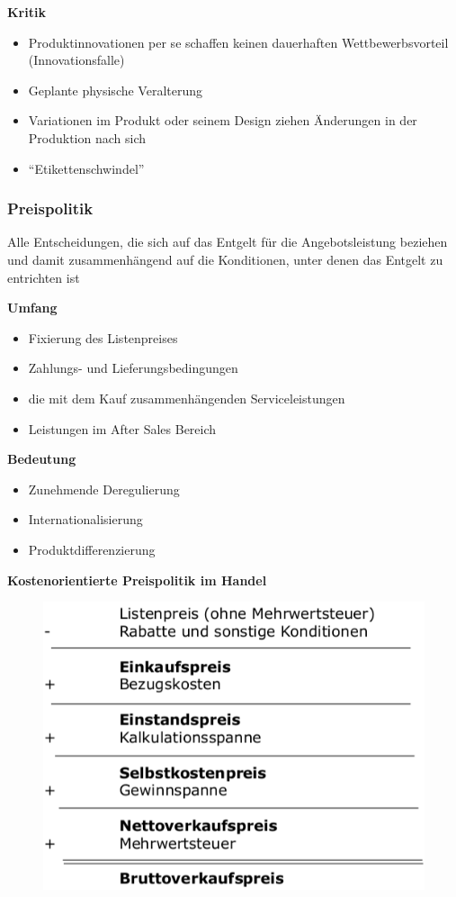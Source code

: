 \documentclass[a4paper,11pt, twoside]{article}
\begin{document}
\textbf{Kritik}
\begin{itemize}
	\item Produktinnovationen per se schaffen keinen dauerhaften Wettbewerbsvorteil (Innovationsfalle)
	\item Geplante physische Veralterung
	\item Variationen im Produkt oder seinem Design ziehen Änderungen in der Produktion nach sich
	\item "`Etikettenschwindel"'
\end{itemize}

\subsubsection{Preispolitik}
Alle Entscheidungen, die sich auf das Entgelt für die Angebotsleistung beziehen und damit zusammenhängend auf die Konditionen, unter denen das Entgelt zu entrichten ist

\textbf{Umfang}
\begin{itemize}
	\item Fixierung des Listenpreises
	\item Zahlungs- und Lieferungsbedingungen
	\item die mit dem Kauf zusammenhängenden Serviceleistungen
	\item Leistungen im After Sales Bereich
\end{itemize}

\textbf{Bedeutung}
\begin{itemize}
	\item Zunehmende Deregulierung
	\item Internationalisierung
	\item Produktdifferenzierung
\end{itemize}

\textbf{Kostenorientierte Preispolitik im Handel}
\begin{figure}[h]
 \begin{center}
   \includegraphics[scale=0.3]{bilder/kostenorientierte_preispolitik.png}
 \end{center}
\end{figure}
\newpage 
\end{document}

